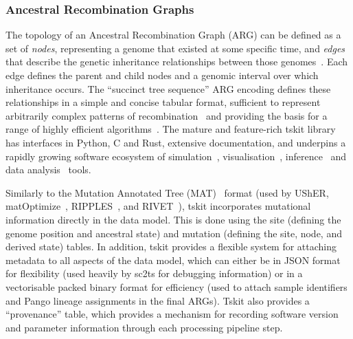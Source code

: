 \documentclass[12pt]{article}
\begin{document}
\subsubsection*{Ancestral Recombination Graphs}
\label{sec:args}
The topology of an Ancestral Recombination Graph (ARG) can be defined
as a set of \emph{nodes}, representing a genome that existed at some specific time,
and \emph{edges} that describe the genetic inheritance relationships between those
genomes~\cite{Wong2024}.
Each edge defines the parent and child nodes and a genomic interval
over which inheritance occurs. The ``succinct tree sequence'' ARG encoding defines
these relationships in a simple and concise tabular format,
sufficient to represent arbitrarily complex patterns of
recombination~\cite{Wong2024} and providing the basis for a range of highly
efficient
algorithms~\cite{Kelleher2016,Ralph2020,Kelleher2020coalescent,
Grundler2025geographic,Lehmann2025args}.
The mature and feature-rich tskit library~\cite{Jeffery2026population}
has interfaces in Python, C and Rust,
extensive documentation,
and underpins a rapidly growing software ecosystem of
simulation~\cite{Baumdicker2022,Haller2019,Petr2023,Tsambos2023link,Tagami2024tstrait,Gopalan2025bridging},
visualisation~\cite{Karthikeyan2025tsbrowse,Kitchens2025tskit,Talbot2025argscape,Katte2026interactive},
inference~\cite{Kelleher2019,Wohns2022,Mahmoudi2022,Martin2025model,Pieszko2025detecting,
Pope2025}
and data
analysis~\cite{Fan2022,Nowbandegani2023extremely,Fritze2024forest,Lee2025genetic}
tools.

Similarly to the Mutation Annotated Tree (MAT)~\cite{McBroome2021} format
(used by
UShER\cite{Turakhia2021},
matOptimize~\cite{DeMaio2023},
RIPPLES~\cite{Turakhia2022}, and
RIVET~\cite{Smith2023tracking}),
tskit incorporates mutational information directly in the data model.
This is done using
the site (defining the genome position and ancestral state) and
mutation (defining the site, node, and derived state)
tables.
In addition, tskit provides a flexible system for attaching metadata
to all aspects of the data model, which can either be in JSON format
for flexibility (used heavily by sc2ts for debugging information)
or in a vectorisable packed binary format for efficiency
(used to attach sample identifiers and Pango lineage assignments in the final ARGs).
Tskit also provides a ``provenance'' table,
which provides a mechanism for recording software version and
parameter information through each processing pipeline step.
\end{document}
